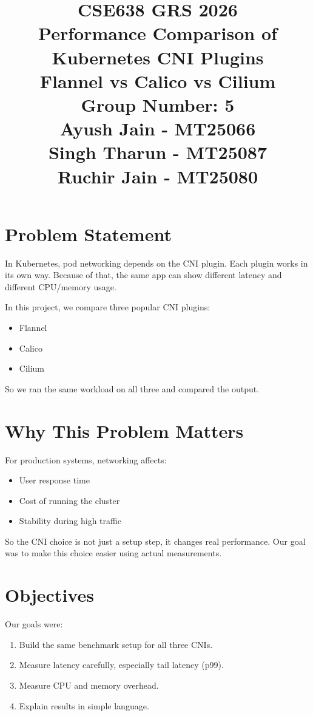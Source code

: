 \documentclass[12pt,a4paper]{article}
\title{\textbf{CSE638 GRS 2026}\\[0.5em]
\textbf{Performance Comparison of Kubernetes CNI Plugins}\\
\large Flannel vs Calico vs Cilium\\[0.6em]
\normalsize Group Number: 5\\
Ayush Jain - MT25066\\
Singh Tharun - MT25087\\
Ruchir Jain - MT25080}
\author{}
\date{}
\begin{document}
\maketitle
\tableofcontents
\newpage

\section{Problem Statement}
In Kubernetes, pod networking depends on the CNI plugin. Each plugin works in its own way. Because of that, the same app can show different latency and different CPU/memory usage.

In this project, we compare three popular CNI plugins:
\begin{itemize}[leftmargin=1.5em]
    \item Flannel
    \item Calico
    \item Cilium
\end{itemize}

So we ran the same workload on all three and compared the output.

\section{Why This Problem Matters}
For production systems, networking affects:
\begin{itemize}[leftmargin=1.5em]
    \item User response time
    \item Cost of running the cluster
    \item Stability during high traffic
\end{itemize}

So the CNI choice is not just a setup step, it changes real performance. Our goal was to make this choice easier using actual measurements.

\section{Objectives}
Our goals were:
\begin{enumerate}[leftmargin=1.8em]
    \item Build the same benchmark setup for all three CNIs.
    \item Measure latency carefully, especially tail latency (p99).
    \item Measure CPU and memory overhead.
    \item Explain results in simple language.
\end{enumerate}
\end{document}
